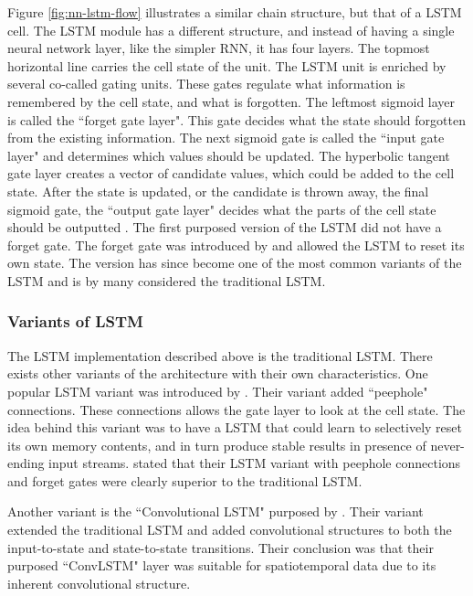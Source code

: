 Figure \ref{fig:nn-lstm-flow} illustrates a similar chain structure, but that of a LSTM cell. The LSTM module has a different structure, and instead of having a single neural network layer, like the simpler RNN, it has four layers. The topmost horizontal line carries the cell state of the unit. The LSTM unit is enriched by several co-called gating units. These gates regulate what information is remembered by the cell state, and what is forgotten. The leftmost sigmoid layer is called the ``forget gate layer". This gate decides what the state should forgotten from the existing information. The next sigmoid gate is called the ``input gate layer" and determines which values should be updated. The hyperbolic tangent gate layer creates a vector of candidate values, which could be added to the cell state. After the state is updated, or the candidate is thrown away, the final sigmoid gate, the ``output gate layer" decides what the parts of the cell state should be outputted \citep{hochreiter1997long, goodfellow2016deeplearning, olah2015lstm, gers2002learning}. The first purposed version of the LSTM did not have a forget gate. The forget gate was introduced by \citep{gers2000learning} and allowed the LSTM to reset its own state. The version has since become one of the most common variants of the LSTM and is by many considered the traditional LSTM.

\subsubsection{Variants of LSTM}
The LSTM implementation described above is the traditional LSTM. There exists other variants of the architecture with their own characteristics. One popular LSTM variant was introduced by \citep{gers2001lstm}. Their variant added ``peephole" connections. These connections allows the gate layer to look at the cell state. The idea behind this variant was to have a LSTM that could learn to selectively reset its own memory contents, and in turn produce stable results in presence of never-ending input streams. \citep{gers2001lstm} stated that their LSTM variant with peephole connections and forget gates were clearly superior to the traditional LSTM. 

Another variant is the ``Convolutional LSTM" purposed by \citep{xingjian2015convolutional}. Their variant extended the traditional LSTM and added convolutional structures to both the input-to-state and state-to-state transitions. Their conclusion was that their purposed ``ConvLSTM" layer was suitable for spatiotemporal data due to its inherent convolutional structure.

